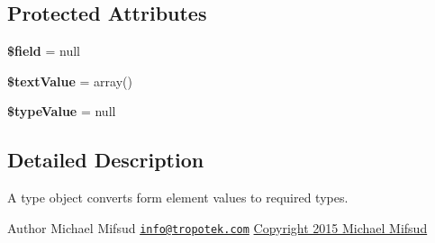 \subsection*{Protected Attributes}
\begin{DoxyCompactItemize}
\item 
\hypertarget{classTk_1_1Form_1_1Type_1_1Iface_ae61588b1bae22ef01c9958f8459f9d72}{{\bfseries \$field} = null}\label{classTk_1_1Form_1_1Type_1_1Iface_ae61588b1bae22ef01c9958f8459f9d72}

\item 
\hypertarget{classTk_1_1Form_1_1Type_1_1Iface_a05bf66cea1de20deae610e38cb5b480c}{{\bfseries \$text\+Value} = array()}\label{classTk_1_1Form_1_1Type_1_1Iface_a05bf66cea1de20deae610e38cb5b480c}

\item 
\hypertarget{classTk_1_1Form_1_1Type_1_1Iface_ae6bec8a3a6be771e90cfa8ab256a6166}{{\bfseries \$type\+Value} = null}\label{classTk_1_1Form_1_1Type_1_1Iface_ae6bec8a3a6be771e90cfa8ab256a6166}

\end{DoxyCompactItemize}


\subsection{Detailed Description}
A type object converts form element values to required types.

\begin{DoxyAuthor}{Author}
Michael Mifsud \href{mailto:info@tropotek.com}{\tt info@tropotek.\+com} \hyperlink{}{Copyright 2015 Michael Mifsud }
\end{DoxyAuthor}


